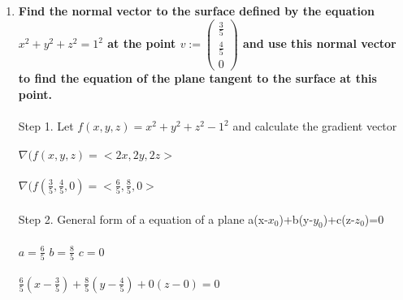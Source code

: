 \documentclass{article}
\begin{document}
\begin{enumerate}[13.]
	\item\textbf{Find the normal vector to the surface defined by the equation $x^{2} + y^{2} + z^{2} =1^{2}$ at the point $v := \left(\!\begin{array}{c} \frac{3}{5}\\ \frac{4}{5} \\ 0 \end{array} \!\right)$ and use this normal vector to find the equation of the plane tangent to the surface at this point.}\\
	\\
	Step 1. Let $f(x,y,z)=x^{2} + y^{2} + z^{2} -1^{2}$ and calculate the gradient vector\\
	\\
	$\nabla(f(x,y,z)=<2x,2y,2z>$\\
	\\
	$\nabla(f(\frac{3}{5},\frac{4}{5},0)=<\frac{6}{5},\frac{8}{5},0>$\\
	\\
	Step 2. General form of a equation of a plane a(x-$x_{0}$)+b(y-$y_{0}$)+c(z-$z_{0}$)=0\\
	\\
	$a=\frac{6}{5}$ $b=\frac{8}{5}$ $c=0$\\
	\\
	$\frac{6}{5}(x-\frac{3}{5})+\frac{8}{5}(y-\frac{4}{5})+0(z-0)=0$
\end{enumerate}
\end{document}
